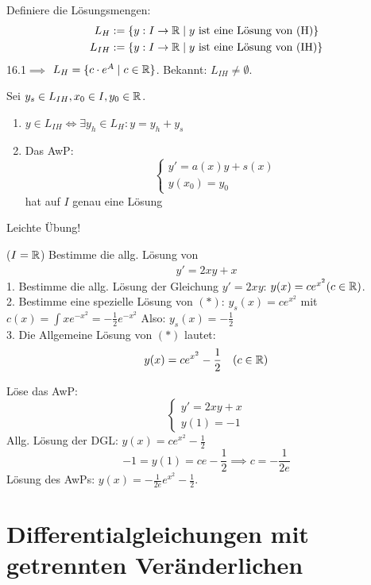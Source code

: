 \documentclass[a4paper,twoside,DIV15,BCOR12mm,chapterprefix=true,headings=twolinechapter]{scrbook}
\begin{document}
\begin{definition}
Definiere die Lösungsmengen:
\begin{align*}
L_H&:=\{y:I\to\mathbb{R}\mid y\text{ ist eine Lösung von (H)}\}\\
L_{IH}&:=\{y:I\to\mathbb{R}\mid y\text{ ist eine Lösung von (IH)}\}
\end{align*}
16.1$\implies$ $L_H=\{c\cdot e^{A}\mid c\in \mathbb{R}\}$. Bekannt: $L_{IH}\ne\emptyset$.
\end{definition}

\begin{satz}
Sei $y_s\in L_{IH}, x_0\in I,y_0\in \mathbb{R}$.
\begin{enumerate}
\item $y\in L_{IH}\iff \exists y_h\in L_{H}: y=y_h+y_s$
\item Das AwP:
\[\begin{cases}
y'=a(x)y+s(x)\\
y(x_0)=y_0
\end{cases}\]
hat auf $I$ genau eine Lösung
\end{enumerate}
\end{satz}

\begin{beweis}
Leichte Übung!
\end{beweis}

\begin{beispiele}
\item ($I=\mathbb{R}$) Bestimme die allg. Lösung von
\begin{align*}
y'=2xy+x\tag{$*$}
\end{align*}
1. Bestimme die allg. Lösung der Gleichung $y'=2xy$: $y(x)=ce^{x^2} (c\in\mathbb{R})$.\\
2. Bestimme eine spezielle Lösung von $(*)$: $y_s(x)=ce^{x^2}$ mit $c(x)=\int xe^{-x^2}=-\frac 12 e^{-x^2}$
Also: $y_s(x)=-\frac12$\\
3. Die Allgemeine Lösung von $(*)$ lautet: 
\[y(x)=ce^{x^2}-\frac 12 \quad(c\in\mathbb{R})\]
\item Löse das AwP:
\[\begin{cases}
y'=2xy+x\\
y(1)=-1
\end{cases}\]
Allg. Lösung der DGL: $y(x)=ce^{x^2}-\frac 12$\\
\[-1=y(1)=ce-\frac 12\implies c=-\frac 1{2e}\]
Lösung des AwPs: $y(x)=-\frac1{2e}e^{x^2}-\frac 12$.
\end{beispiele}

\chapter{Differentialgleichungen mit getrennten Veränderlichen}
\end{document}
